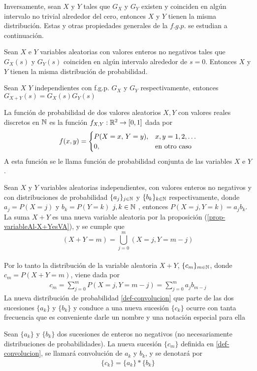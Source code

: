 Inversamente, sean $X$ y $Y$ tales que $G_X$ y
$G_Y$ existen y coinciden en algún intervalo no trivial alrededor del cero,
entonces $X$ y $Y$ tienen la misma distribución. Estas y otras propiedades
generales de la $f.g.p.$ se estudian a continuación.
\begin{Prop}
    Sean $X$ e $Y$ variables aleatorias con valores enteros no negativos tales que $G_X(s)$ y $G_Y(s)$ coinciden en algún intervalo alrededor de $s=0$. Entonces $X$ y $Y$ tienen la misma distribución de probabilidad. \label{prop-funcionGenIgual-distribucuionIgual}
\end{Prop}
\begin{Prop}
    Sean $X$  $Y$ independientes con f.g.p. $G_X$ y $G_Y$ respectivamente, entonces $G_{X+Y}(s)=G_X(s)G_Y(s)$
    \label{prop-funcionGenSuma-productoFuncionGen}
\end{Prop}
\begin{Def} 
    La función de probabilidad de dos valores aleatorios $X, Y$ con valores reales discretos en ${\mathbb{N}}$ es la función $f_{X,Y} :{\mathbb{R}}^2 \rightarrow [0, 1]$ dada por
    $$f(x,y)=
    \begin{cases}
        P(X=x,\thinspace Y=y), & \mbox{$x,y=1,2,\ldots$}\\
        0,& \mbox{en otro caso}
    \end{cases}$$
    A esta función se le llama función de probabilidad conjunta de las variables $X$ e $Y$.
\end{Def}
Sean $X$ y $Y$ variables aleatorias independientes, con valores enteros no negativos y con distribuciones de probabilidad $\{a_j\}_{j\in{\mathbb{N}}}$ y $\{b_k\}_{k\in{\mathbb{N}}}$ respectivamente, donde $a_j=P(X=j)$ y  $b_k=P(Y=k)$ $j,k\in{\mathbb{N}}$ , entonces $P(X=j,Y=k)=a_j b_k$.\\ La suma $X+Y$ es una nueva variable aleatoria por la proposición (\ref{prop-variableAl-X+YesVA}), y se cumple que $$(X+Y=m)=\bigcup_{j=0}^{m}(X=j,Y=m-j)$$ \\ Por lo tanto la distribución de la variable aleatoria $X+Y$, $\{c_m\}_{m\in{\mathbb{N}}}$, donde $c_m=P(X+Y=m)$, viene dada por
\begin{eqnarray}
    c_m=\sum_{j=0}^m P(X=j,Y=m-j)=\sum_{j=0}^m a_j b_{m-j}\label{def-convolucion}
\end{eqnarray}
La nueva distribución de probabilidad \ref{def-convolucion} que parte de las dos sucesiones $\{a_k\}$ y $\{b_k\}$ y conduce a una nueva sucesión $\{c_k\}$ ocurre con tanta frecuencia que es conveniente darle un nombre y una notación especial para ella
\begin{Def}
    Sean $\{a_k\}$ y $\{b_k\}$ dos sucesiones de enteros no negativos (no necesariamente distribuciones de probabilidades). La nueva sucesión $\{c_m\}$ definida en \ref{def-convolucion}, se llamará convolución de $a_k$ y $b_k$, y se denotará por
    \begin{eqnarray}
        \{c_k\}=\{a_k\}*\{b_k\}
        \label{def-notaciónConvolucion}
    \end{eqnarray}
\end{Def}
